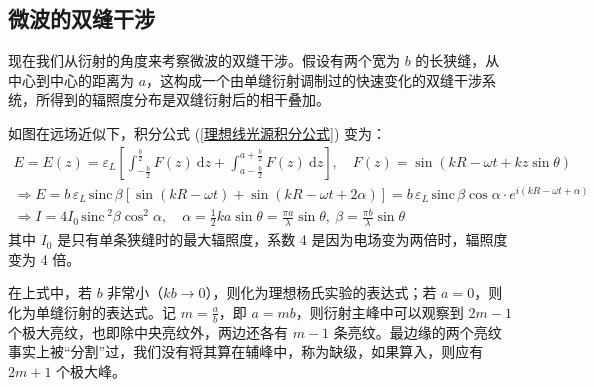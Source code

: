 \documentclass[UTF8]{article}
\def\sinc{\mathrm{\,sinc}\,}
\theoremstyle{MyLineTheoremStyle} %
\theoremstyle{MyBlockTheoremStyle} %
\theoremstyle{MySubsubsectionStyle} %
\begin{document}
\subsection{微波的双缝干涉}

现在我们从衍射的角度来考察微波的双缝干涉。假设有两个宽为 $b$ 的长狭缝，从中心到中心的距离为 $a$，这构成一个由单缝衍射调制过的快速变化的双缝干涉系统，所得到的辐照度分布是双缝衍射后的相干叠加。

如图在远场近似下，积分公式 (\ref{理想线光源积分公式}) 变为：
\begin{gather}
E  = E(z)= \varepsilon_L \left[\int_{-\frac{b}{2}}^{\frac{b}{2}} F(z) \ \mathrm{d}z + \int_{a-\frac{b}{2}}^{a+\frac{b}{2}} F(z) \ \mathrm{d}z\right]
,\quad F(z) = \sin \left(kR - \omega t + kz \sin \theta\right) \\ 
\Longrightarrow E = b\,\varepsilon_L \sinc \beta \left[\sin (kR - \omega t) + \sin (kR - \omega t + 2\alpha)\right] = b\,\varepsilon_L \sinc \beta \cos \alpha \cdot e^{i(kR - \omega t + \alpha)} \\ 
\Longrightarrow I = 4 I_0 \sinc^2 \beta \cos^2 \alpha,\quad \alpha = \frac{1}{2}k a \sin \theta = \frac{\pi a}{\lambda} \sin \theta,\ \beta = \frac{\pi b}{\lambda} \sin \theta
\end{gather}
其中 $I_0$ 是只有单条狭缝时的最大辐照度，系数 4 是因为电场变为两倍时，辐照度变为 4 倍。

在上式中，若 $b$ 非常小（$kb \to 0$），则化为理想杨氏实验的表达式；若 $a = 0$，则化为单缝衍射的表达式。记 $m = \frac{a}{b}$，即 $a = mb$，则衍射主峰中可以观察到 $2m-1$ 个极大亮纹，也即除中央亮纹外，两边还各有 $m-1$ 条亮纹。最边缘的两个亮纹事实上被“分割”过，我们没有将其算在辅峰中，称为缺级，如果算入，则应有 $2m + 1$ 个极大峰。
\end{document}
